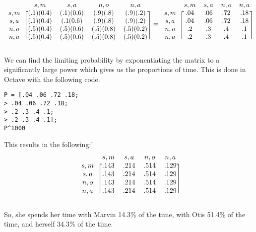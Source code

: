 \documentclass[10pt,a4paper]{exam}
\begin{document}
\begin{questions}
\begin{solution}
\[
\begin{blockarray}{ccccc}
& s,m & s,a & n,o & n,a \\
\begin{block}{c[cccc]}
s,m & (.1)(0.4) & (.1)(0.6) & (.9)(.8) & (.9)(.2)\\
s,a  & (.1)(0.4) & (.1(0.6) & (.9)(.8) & (.9)(.2)\\
n,o  & (.5)(0.4) & (.5)(0.6) & (.5)(0.8) & (.5)(0.2)\\
n,a  & (.5)(0.4) & (.5)(0.6) & (.5)(0.8) & (.5)(0.2)\\
\end{block}
\end{blockarray} = \begin{blockarray}{ccccc}
& s,m & s,a & n,o & n,a \\
\begin{block}{c[cccc]}
s,m & .04 & .06 & .72 & .18\\
s,a  & .04 & .06 & .72 & .18\\
n,o  & .2 & .3 & .4 & .1\\
n,a  & .2 & .3 & .4 & .1\\
\end{block}
\end{blockarray}
\]

We can find the limiting probability by exponentiating the matrix to a significantly large power which gives us the proportions of time. This is done in Octave with the following code.
\begin{verbatim}
P = [.04 .06 .72 .18;
> .04 .06 .72 .18;
> .2 .3 .4 .1;
> .2 .3 .4 .1];
P^1000
\end{verbatim}

This results in the following:'
$$\begin{blockarray}{ccccc}
& s,m & s,a & n,o & n,a \\
\begin{block}{c[cccc]}
s,m & .143 & .214 & .514 & .129\\
s,a  & .143 & .214 & .514 & .129\\
n,o  & .143 & .214 & .514 & .129\\
n,a  & .143 & .214 & .514 & .129\\
\end{block}
\end{blockarray}$$

So, she spends her time with Marvin 14.3\% of the time, with Otis 51.4\% of the time, and herself 34.3\% of the time.

\end{solution}


\end{questions}
\end{document}
